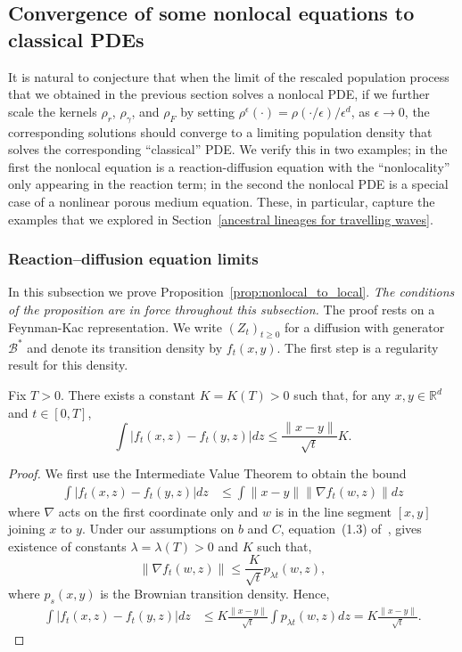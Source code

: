 \documentclass[EJP]{ejpecp} %
\newcommand{\DG}{\mathcal{B}}  %
\begin{document}
\subsection{Convergence of some nonlocal equations to classical PDEs}
\label{subsec:nonlocal to local}

It is natural to conjecture that when the limit of the rescaled 
population process that we obtained in the previous section solves a nonlocal
PDE, if we further scale the kernels 
$\rho_r$, $\rho_\gamma$, and $\rho_F$ by setting 
$\rho^\epsilon(\cdot)=\rho(\cdot/\epsilon)/\epsilon^d$, as $\epsilon\to 0$, the 
corresponding solutions should converge to a limiting
population density that solves the corresponding ``classical'' PDE. We verify
this in two examples; in the first the nonlocal equation is a reaction-diffusion equation
with the ``nonlocality'' only appearing in the 
reaction term; in the second the nonlocal PDE is a special 
case of a nonlinear porous medium equation. These, in particular,
capture the examples that we explored in 
Section~\ref{ancestral lineages for travelling waves}.

\subsubsection{Reaction--diffusion equation limits}
\label{two-step convergence to FKPP}

In this subsection we prove Proposition~\ref{prop:nonlocal_to_local}. {\em The conditions of the
proposition are in force throughout this subsection.} 
The proof rests on a Feynman-Kac representation.
We write $(Z_t)_{t\geq 0}$ for a diffusion with generator $\DG^*$ and denote 
its transition density by $f_t(x,y)$. The first step is a regularity
result for this density.

\begin{lemma} \label{regularityForX1}
Fix $T>0$. There exists a constant $K= K(T)>0$ such that, for any 
$x, y\in \mathbb{R}^d$ and $t \in [0,T]$,
\begin{equation} \label{eq:boundDensityXt}
\int |f_t(x,z)-f_t(y,z)| dz \leq \frac{\|x-y\|}{\sqrt{t}} K.
\end{equation}
\end{lemma}
\begin{proof}
We first use the Intermediate Value Theorem to obtain the bound
\begin{align*}
\int |f_t(x,z)-f_t(y,z)| dz & \leq \int \|x-y\| \|\nabla f_t(w,z)\| dz
\end{align*}
where $\nabla$ acts on the first coordinate only and $w$ is in the line 
segment $[x,y]$ joining $x$ to $y$. 
Under our assumptions on $b$ and $C$, equation~(1.3) 
of~\cite{sheu:1991}, gives existence of constants 
$\lambda=\lambda(T)>0$ and $K$ such that,
\[ \|\nabla f_t(w,z)\|  \leq  \frac{K }{\sqrt{t}}p_{ \lambda  t}(w,z), \]
where $p_s(x,y)$ is the Brownian transition density.
Hence, 
\begin{align*}
\int |f_t(x,z)-f_t(y,z)| dz & \leq K 
\frac{\|x-y\|}{\sqrt{t}} \int p_{\lambda  t}(w,z)dz = 
K  \frac{\|x-y\|}{\sqrt{t}} .
\end{align*}
\end{proof}
\end{document}
